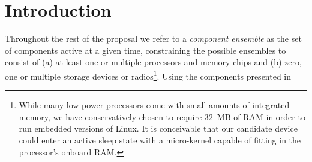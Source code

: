 \section{Introduction}

 Throughout the rest of the proposal we refer to a
\textit{component ensemble} as the set of components active at a given time,
constraining the possible ensembles to consist of (a) at least one or
multiple processors and memory chips and (b) zero, one or multiple storage
devices or radios\footnote{While many low-power processors come with small
amounts of integrated memory, we have conservatively chosen to require 32~MB
of RAM in order to run embedded versions of Linux. It is conceivable that our
candidate device could enter an active sleep state with a micro-kernel
capable of fitting in the processor's onboard RAM.}. Using the components
presented in

\clearpage

